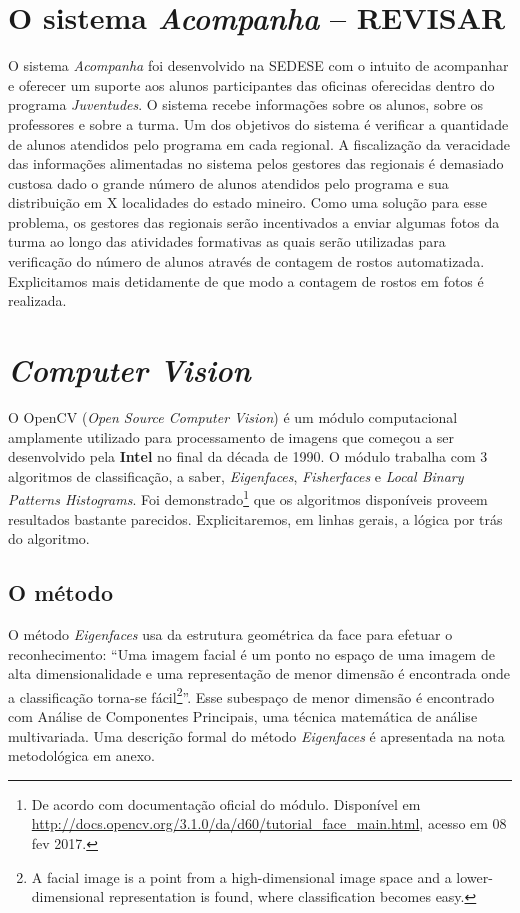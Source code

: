 \documentclass[a4paper, 12pt, openright, oneside, english, brazil, article]{abntex2}
\begin{document}
	\section*{O sistema \textit{Acompanha} -- REVISAR}
	
	O sistema \textit{Acompanha} foi desenvolvido na SEDESE com o intuito de acompanhar e oferecer um suporte aos alunos participantes das oficinas oferecidas dentro do programa \textit{Juventudes}. O sistema recebe informações sobre os alunos, sobre os professores e sobre a turma. Um dos objetivos do sistema é verificar a quantidade de alunos atendidos pelo programa em cada regional. A fiscalização da veracidade das informações alimentadas no sistema pelos gestores das regionais é demasiado custosa dado o grande número de alunos atendidos pelo programa e sua distribuição em X localidades do estado mineiro. Como uma solução para esse problema, os gestores das regionais serão incentivados a enviar algumas fotos da turma ao longo das atividades formativas as quais serão utilizadas para verificação do número de alunos através de contagem de rostos automatizada. Explicitamos mais detidamente de que modo a contagem de rostos em fotos é realizada.
	
	\section*{\textit{Computer Vision}}
	
	O OpenCV (\textit{Open Source Computer Vision}) é um módulo computacional amplamente utilizado para processamento de imagens que começou a ser desenvolvido pela \textbf{Intel} no final da década de 1990. O módulo trabalha com 3 algoritmos de classificação, a saber, \textit{Eigenfaces}, \textit{Fisherfaces} e \textit{Local Binary Patterns Histograms}. Foi demonstrado\footnote{De acordo com documentação oficial do módulo. Disponível em \url{http://docs.opencv.org/3.1.0/da/d60/tutorial_face_main.html}, acesso em 08 fev 2017.} que os algoritmos disponíveis proveem resultados bastante parecidos. Explicitaremos, em linhas gerais, a lógica por trás do algoritmo.
	
	\subsection*{O método}
	
	O método \textit{Eigenfaces} usa da estrutura geométrica da face para efetuar o reconhecimento: ``Uma imagem facial é um ponto no espaço de uma imagem de alta dimensionalidade e uma representação de menor dimensão é encontrada onde a classificação torna-se fácil\footnote{A facial image is a point from a high-dimensional image space and a lower-dimensional representation is found, where classification becomes easy.}''. Esse subespaço de menor dimensão é encontrado com Análise de Componentes Principais, uma técnica matemática de análise multivariada. Uma descrição formal do método \textit{Eigenfaces} é apresentada na nota metodológica em anexo.
	
\end{document}

